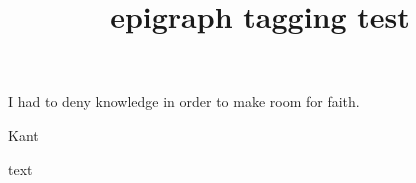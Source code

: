 \documentclass{article}
\title{epigraph tagging test}
\begin{document}
\epigraph{I had to deny knowledge in order to make room for faith.}{Kant}
text
\end{document}
